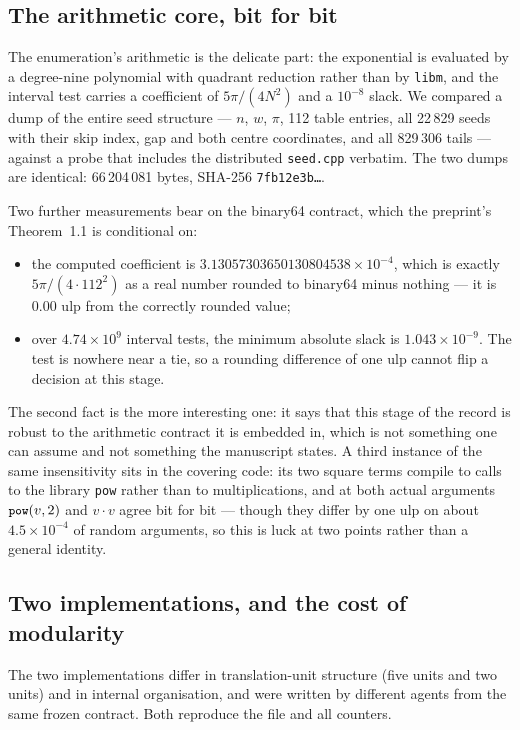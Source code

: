 \documentclass[11pt,a4paper]{article}
\newcommand{\code}[1]{\texttt{\small #1}}
\newcommand{\sha}[1]{\texttt{\scriptsize #1}}
\begin{document}
\subsection{The arithmetic core, bit for bit}
The enumeration's arithmetic is the delicate part: the exponential is evaluated by a degree-nine
polynomial with quadrant reduction rather than by \code{libm}, and the interval test carries a
coefficient of $5\pi/(4N^2)$ and a $10^{-8}$ slack. We compared a dump of the entire seed structure
--- $n$, $w$, $\pi$, 112 table entries, all 22\,829 seeds with their skip index, gap and both centre
coordinates, and all 829\,306 tails --- against a probe that includes the distributed
\code{seed.cpp} verbatim. The two dumps are identical: 66\,204\,081 bytes, SHA-256
\sha{7fb12e3b\ldots}.

Two further measurements bear on the binary64 contract, which the preprint's Theorem~1.1 is
conditional on:
\begin{itemize}
\item the computed coefficient is $3.13057303650130804538\times10^{-4}$, which is exactly
$5\pi/(4\cdot112^2)$ as a real number rounded to binary64 minus nothing --- it is $0.00$ ulp from the
correctly rounded value;
\item over $4.74\times10^{9}$ interval tests, the minimum absolute slack is $1.043\times10^{-9}$. The
test is nowhere near a tie, so a rounding difference of one ulp cannot flip a decision at this stage.
\end{itemize}

The second fact is the more interesting one: it says that this stage of the record is robust to the
arithmetic contract it is embedded in, which is not something one can assume and not something the
manuscript states. A third instance of the same insensitivity sits in the covering code: its two
square terms compile to calls to the library \code{pow} rather than to multiplications, and at both
actual arguments $\code{pow}(v,2)$ and $v\cdot v$ agree bit for bit --- though they differ by one ulp
on about $4.5\times10^{-4}$ of random arguments, so this is luck at two points rather than a general
identity.

\subsection{Two implementations, and the cost of modularity}
The two implementations differ in translation-unit structure (five units and two units) and in
internal organisation, and were written by different agents from the same frozen contract. Both
reproduce the file and all counters.
\end{document}
